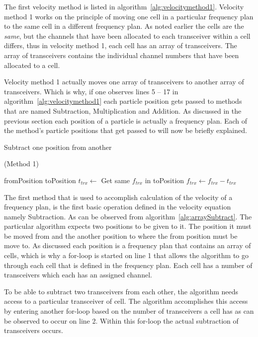The first velocity method is listed in algorithm~\ref{alg:velocitymethod1}. Velocity method 1 works on the principle of moving one cell in a particular frequency plan to the same cell in a different frequency plan. As noted earlier the cells are the \emph{same}, but the channels that have been allocated to each transceiver within a cell differs, thus in velocity method 1, each cell has an array of transceivers. The array of transceivers contains the individual channel numbers that have been allocated to a cell.

Velocity method 1 actually moves one array of transceivers to another array of transceivers. Which is why, if one observes lines 5 -- 17 in algorithm~\ref{alg:velocitymethod1} each particle position gets passed to methods that are named Subtraction, Multiplication and Addition. As discussed in the previous section each position of a particle is actually a frequency plan. Each of the method's particle positions that get passed to will now be briefly explained.

\begin{algorithm}
\caption{Subtract one position from another} (Method 1)
\label{alg:arraySubtract}
\begin{algorithmic}[1]
	\REQUIRE fromPosition
	\REQUIRE toPosition
			\STATE $t_{trx} \leftarrow$ Get same $f_{trx}$ in toPosition
			\STATE $f_{trx} \leftarrow f_{trx} - t_{trx}$
		\ENDFOR
	\ENDFOR
\end{algorithmic}
\end{algorithm}

The first method that is used to accomplish calculation of the velocity of a frequency plan, is the first basic operation defined in the velocity equation namely Subtraction. As can be observed from algorithm~\ref{alg:arraySubtract}. The particular algorithm expects two positions to be given to it. The position it must be moved from and the another position to where the from position must be move to. As discussed each position is a frequency plan that contains an array of cells, which is why a for-loop is started on line 1 that allows the algorithm to go through each cell that is defined in the frequency plan. Each cell has a number of transceivers which each has an assigned channel. 

To be able to subtract two transceivers from each other, the algorithm needs access to a particular transceiver of cell. The algorithm accomplishes this access by entering another for-loop based on the number of transceivers a cell has as can be observed to occur on line 2. Within this for-loop the actual subtraction of transceivers occurs.

